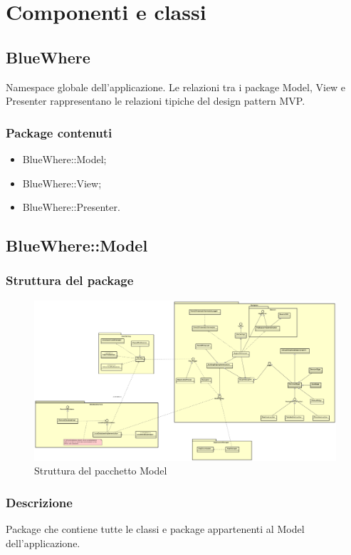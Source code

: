 \documentclass[../SpecificaTecnica.tex]{subfiles}
\begin{document}
\section{Componenti e classi}
	\subsection{BlueWhere}
	Namespace globale dell'applicazione. Le relazioni tra i package Model, View e Presenter rappresentano le relazioni tipiche del design pattern MVP.
		\subsubsection{Package contenuti}
			\begin{itemize}
				\item BlueWhere::Model;
				\item BlueWhere::View;
				\item BlueWhere::Presenter.
			\end{itemize}
	\newpage
	\subsection{BlueWhere::Model}
		\subsubsection{Struttura del package}
				\begin{figure}[!h]
					\centering
					\includegraphics[scale=0.12]{diagrammi/Model.png}
						\caption{Struttura del pacchetto Model}
					\label{fig:Struttura_MVP}
				\end{figure} 
		\subsubsection{Descrizione}
			Package che contiene tutte le classi e package appartenenti al Model dell'applicazione.
\end{document}

